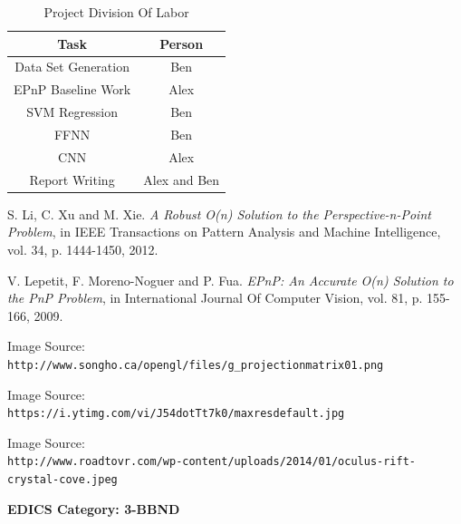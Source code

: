 \documentclass[journal]{IEEEtran}
\begin{document}
\begin{table}[h]
	\caption{Project Division Of Labor}
	\label{SomeTable}
	\centering
	\begin{tabular}{|c|c|}
		\hline
		Task &  Person\\
		\hline
		Data Set Generation &  Ben\\
		
		EPnP Baseline Work &  Alex\\
		SVM Regression & Ben\\
		FFNN & Ben \\
		CNN & Alex\\
		Report Writing & Alex and Ben\\
		\hline
		
		
	\end{tabular}
\end{table}



\begin{thebibliography}{10}
	
	S. Li, C. Xu and M. Xie. \textit{A Robust O(n) Solution to the Perspective-n-Point Problem}, in IEEE Transactions on Pattern Analysis and Machine Intelligence, vol. 34, p. 1444-1450, 2012.
	
	V. Lepetit, F. Moreno-Noguer and P. Fua. \textit{EPnP: An Accurate O(n) Solution to the PnP Problem}, in International Journal Of Computer Vision, vol. 81, p. 155-166, 2009.

	Image Source: \\\texttt{http://www.songho.ca/opengl/files/g\_projectionmatrix01.png}
	
	Image Source: \\\texttt{https://i.ytimg.com/vi/J54dotTt7k0/maxresdefault.jpg}
	
	
	Image Source: \\\texttt{http://www.roadtovr.com/wp-content/uploads/2014/01/oculus-rift-crystal-cove.jpeg}

\end{thebibliography}

 \ifCLASSOPTIONpeerreview
 \begin{center} \bfseries EDICS Category: 3-BBND \end{center}
 \fi



\IEEEpeerreviewmaketitle




   
\end{document}
